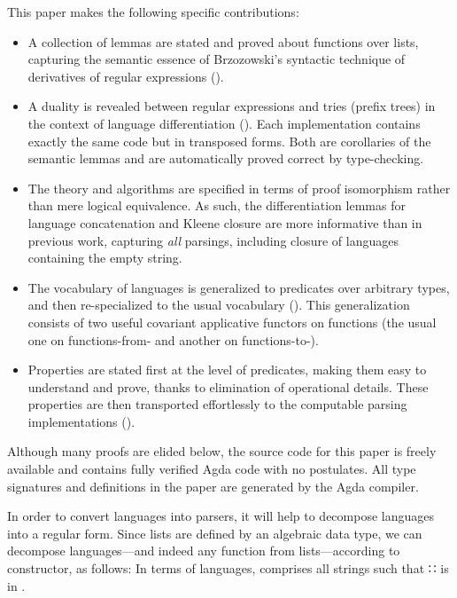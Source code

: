 \documentclass[acmsmall,screen,anonymous,timestamp]{acmart}
\begin{document}
This paper makes the following specific contributions:
\begin{itemize}
\item
  A collection of lemmas are stated and proved about functions over lists, capturing the semantic essence of Brzozowski's syntactic technique of derivatives of regular expressions ().
\item
  A duality is revealed between regular expressions and tries (prefix trees) in the context of language differentiation ().
  Each implementation contains exactly the same code but in transposed forms.
  Both are corollaries of the semantic lemmas and are automatically proved correct by type-checking.
\item
  The theory and algorithms are specified in terms of proof isomorphism rather than mere logical equivalence.
  As such, the differentiation lemmas for language concatenation and Kleene closure are more informative than in previous work, capturing \emph{all} parsings, including closure of languages containing the empty string.
\item
  The vocabulary of languages is generalized to predicates over arbitrary types, and then re-specialized to the usual vocabulary ().
  This generalization consists of two useful covariant applicative functors on functions (the usual one on functions-from- and another on functions-to-).
\item
  Properties are stated first at the level of predicates, making them easy to understand and prove, thanks to elimination of operational details.
  These properties are then transported effortlessly to the computable parsing implementations ().
\end{itemize}
Although many proofs are elided below, the source code for this paper is freely available and contains fully verified Agda code with no postulates.
All type signatures and definitions in the paper are generated by the Agda compiler.


\rnc{}

In order to convert languages into parsers, it will help to decompose languages into a regular form.
Since lists are defined by an algebraic data type, we can decompose languages---and indeed any function from lists---according to constructor, as follows:
In terms of languages, {  } comprises all strings  such that { \AIC ∷ } is in .
\end{document}
